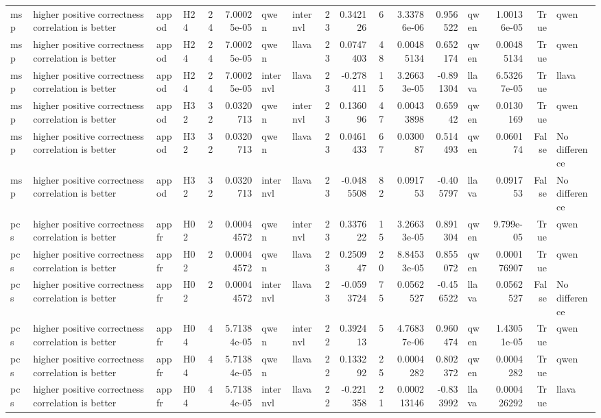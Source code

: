 \begin{longtable}{llllrrllrrrrrlrrl}
msp & higher positive correctness correlation is better & appod & H24 & 24 & 7.00025e-05 & qwen & internvl & 23 & 0.342126 & 6 & 3.33786e-06 & 0.956522 & qwen & 1.00136e-05 & True & qwen \\
msp & higher positive correctness correlation is better & appod & H24 & 24 & 7.00025e-05 & qwen & llava & 23 & 0.0747403 & 48 & 0.00485134 & 0.652174 & qwen & 0.00485134 & True & qwen \\
msp & higher positive correctness correlation is better & appod & H24 & 24 & 7.00025e-05 & internvl & llava & 23 & -0.278411 & 15 & 3.26633e-05 & -0.891304 & llava & 6.53267e-05 & True & llava \\
msp & higher positive correctness correlation is better & appod & H32 & 32 & 0.0320713 & qwen & internvl & 23 & 0.136096 & 47 & 0.00433898 & 0.65942 & qwen & 0.0130169 & True & qwen \\
msp & higher positive correctness correlation is better & appod & H32 & 32 & 0.0320713 & qwen & llava & 23 & 0.0461433 & 67 & 0.030087 & 0.514493 & qwen & 0.060174 & False & No difference \\
msp & higher positive correctness correlation is better & appod & H32 & 32 & 0.0320713 & internvl & llava & 23 & -0.0485508 & 82 & 0.091753 & -0.405797 & llava & 0.091753 & False & No difference \\
pcs & higher positive correctness correlation is better & appfr & H02 & 2 & 0.00044572 & qwen & internvl & 23 & 0.337622 & 15 & 3.26633e-05 & 0.891304 & qwen & 9.799e-05 & True & qwen \\
pcs & higher positive correctness correlation is better & appfr & H02 & 2 & 0.00044572 & qwen & llava & 23 & 0.250947 & 20 & 8.84533e-05 & 0.855072 & qwen & 0.000176907 & True & qwen \\
pcs & higher positive correctness correlation is better & appfr & H02 & 2 & 0.00044572 & internvl & llava & 23 & -0.0593724 & 75 & 0.0562527 & -0.456522 & llava & 0.0562527 & False & No difference \\
pcs & higher positive correctness correlation is better & appfr & H04 & 4 & 5.71384e-05 & qwen & internvl & 22 & 0.392413 & 5 & 4.76837e-06 & 0.960474 & qwen & 1.43051e-05 & True & qwen \\
pcs & higher positive correctness correlation is better & appfr & H04 & 4 & 5.71384e-05 & qwen & llava & 22 & 0.133292 & 25 & 0.0004282 & 0.802372 & qwen & 0.0004282 & True & qwen \\
pcs & higher positive correctness correlation is better & appfr & H04 & 4 & 5.71384e-05 & internvl & llava & 22 & -0.221358 & 21 & 0.000213146 & -0.833992 & llava & 0.000426292 & True & llava \\

\end{longtable}
